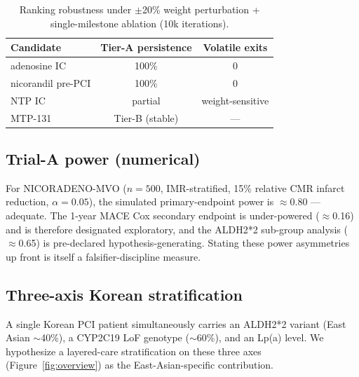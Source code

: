 \documentclass[11pt]{article}
\begin{document}
\begin{table}[h]
\centering
\caption{Ranking robustness under $\pm$20\% weight perturbation + single-milestone ablation (10k iterations).}
\label{tab:mc}
\begin{tabular}{lcc}
\toprule
Candidate & Tier-A persistence & Volatile exits \\
\midrule
adenosine IC      & 100\% & 0 \\
nicorandil pre-PCI & 100\% & 0 \\
NTP IC            & partial & weight-sensitive \\
MTP-131           & Tier-B (stable) & --- \\
\bottomrule
\end{tabular}
\end{table}

\subsection{Trial-A power (numerical)}
For NICORADENO-MVO ($n{=}500$, IMR-stratified, 15\% relative CMR infarct reduction, $\alpha{=}0.05$), the simulated primary-endpoint power is $\approx$0.80 --- adequate. The 1-year MACE Cox secondary endpoint is under-powered ($\approx$0.16) and is therefore designated exploratory, and the ALDH2*2 sub-group analysis ($\approx$0.65) is pre-declared hypothesis-generating. Stating these power asymmetries up front is itself a falsifier-discipline measure.

\subsection{Three-axis Korean stratification}
A single Korean PCI patient simultaneously carries an ALDH2*2 variant (East Asian $\sim$40\%), a CYP2C19 LoF genotype ($\sim$60\%), and an Lp(a) level. We hypothesize a layered-care stratification on these three axes (Figure~\ref{fig:overview}) as the East-Asian-specific contribution.
\end{document}
